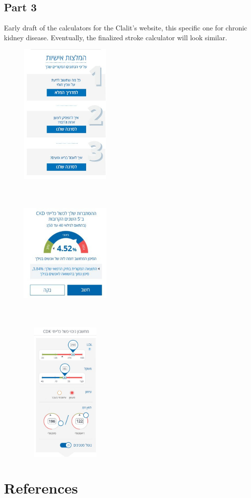\documentclass[a4paper,12pt]{article}
\begin{document}
	\subsection{Part 3}
	
	Early draft of the calculators for the Clalit's website, this specific one for chronic kidney disease. Eventually, the finalized stroke calculator will look similar.
	
	\begin{figure}[H]
		\begin{minipage}{.3\linewidth}
			\includegraphics[width=4.5cm, height=7cm]{prelim-results/calc3}
			\label{calc3}
		\end{minipage}
		\hspace{.01\linewidth}
		\begin{minipage}{.3\linewidth}
			\includegraphics[width=4.5cm, height=7cm]{prelim-results/calc2b}
			\label{calc2}
		\end{minipage}
		\hspace{.01\linewidth}
		\begin{minipage}{.3\linewidth}
			\includegraphics[width=4.5cm, height=7cm]{prelim-results/calc1}
			\label{calc1}
		\end{minipage}
	\end{figure}
	
	\section{References}
	
   	\printbibliography[heading=none]
	
\end{document}
